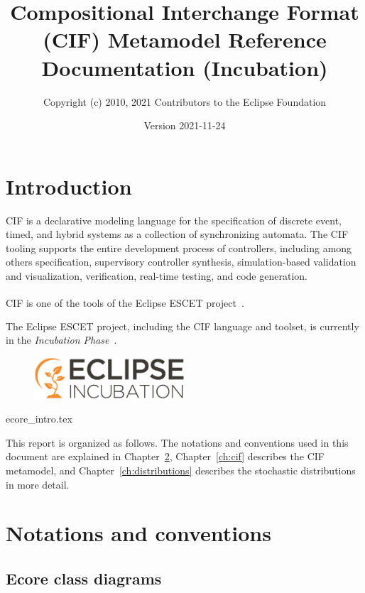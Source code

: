 \documentclass{report}
\title{Compositional Interchange Format (CIF) Metamodel Reference Documentation (Incubation)}
\author{Copyright (c) 2010, 2021 Contributors to the Eclipse Foundation}
\date{Version 2021-11-24}
\begin{document}
\maketitle
\tableofcontents

\chapter{Introduction}
CIF is a declarative modeling language for the specification of discrete
event, timed, and hybrid systems as a collection of synchronizing automata.
The CIF tooling supports the entire development process of controllers,
including among others specification, supervisory controller synthesis,
simulation-based validation and visualization, verification, real-time
testing, and code generation.

CIF is one of the tools of the Eclipse ESCET\textsuperscript{\texttrademark{}}
project~\cite{Eclipse:ESCET}.

The Eclipse ESCET project, including the CIF language and toolset, is
currently in the \emph{Incubation Phase}~\cite{Eclipse:Incubation}.
\begin{figure}[H]
  \centering
  \includegraphics[width=0.5\textwidth]{figures/eclipse-incubation.png}
\end{figure}


       {ecore_intro.tex}

This report is organized as follows. The notations and conventions used in
this document are explained in Chapter~\ref{ch:notations-conventions},
Chapter~\ref{ch:cif} describes the CIF metamodel, and
Chapter~\ref{ch:distributions} describes the stochastic distributions in more
detail.


\chapter{Notations and conventions}\label{ch:notations-conventions}

\section{Ecore class diagrams}
\end{document}
